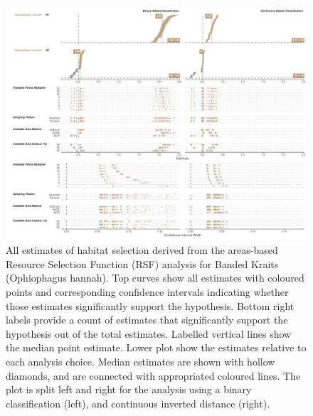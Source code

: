 \documentclass[10pt,a4paper]{article}
\begin{document}
\begin{figure}
\includegraphics[width=1\linewidth]{../../figures/specCurve_Ophiophagus hannah_rsf} \caption{All estimates of habitat selection derived from the areas-based Resource Selection Function (RSF) analysis for Banded Kraits (Ophiophagus hannah). Top curves show all estimates with coloured points and corresponding confidence intervals indicating whether those estimates significantly support the hypothesis. Bottom right labels provide a count of estimates that significantly support the hypothesis out of the total estimates. Labelled vertical lines show the median point estimate. Lower plot show the estimates relative to each analysis choice. Median estimates are shown with hollow diamonds, and are connected with appropriated coloured lines. The plot is split left and right for the analysis using a binary classification (left), and continuous inverted distance (right).}\label{fig:specCurveRsfOPHA}
\end{figure}
\end{document}
